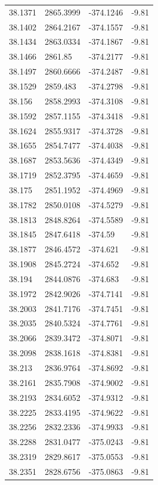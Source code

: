 \begin{table}[H]
\begin{tabular}{llll}
38.1371 & 2865.3999 & -374.1246 & -9.81 \\
38.1402 & 2864.2167 & -374.1557 & -9.81 \\
38.1434 & 2863.0334 & -374.1867 & -9.81 \\
38.1466 & 2861.85 & -374.2177 & -9.81 \\
38.1497 & 2860.6666 & -374.2487 & -9.81 \\
38.1529 & 2859.483 & -374.2798 & -9.81 \\
38.156 & 2858.2993 & -374.3108 & -9.81 \\
38.1592 & 2857.1155 & -374.3418 & -9.81 \\
38.1624 & 2855.9317 & -374.3728 & -9.81 \\
38.1655 & 2854.7477 & -374.4038 & -9.81 \\
38.1687 & 2853.5636 & -374.4349 & -9.81 \\
38.1719 & 2852.3795 & -374.4659 & -9.81 \\
38.175 & 2851.1952 & -374.4969 & -9.81 \\
38.1782 & 2850.0108 & -374.5279 & -9.81 \\
38.1813 & 2848.8264 & -374.5589 & -9.81 \\
38.1845 & 2847.6418 & -374.59 & -9.81 \\
38.1877 & 2846.4572 & -374.621 & -9.81 \\
38.1908 & 2845.2724 & -374.652 & -9.81 \\
38.194 & 2844.0876 & -374.683 & -9.81 \\
38.1972 & 2842.9026 & -374.7141 & -9.81 \\
38.2003 & 2841.7176 & -374.7451 & -9.81 \\
38.2035 & 2840.5324 & -374.7761 & -9.81 \\
38.2066 & 2839.3472 & -374.8071 & -9.81 \\
38.2098 & 2838.1618 & -374.8381 & -9.81 \\
38.213 & 2836.9764 & -374.8692 & -9.81 \\
38.2161 & 2835.7908 & -374.9002 & -9.81 \\
38.2193 & 2834.6052 & -374.9312 & -9.81 \\
38.2225 & 2833.4195 & -374.9622 & -9.81 \\
38.2256 & 2832.2336 & -374.9933 & -9.81 \\
38.2288 & 2831.0477 & -375.0243 & -9.81 \\
38.2319 & 2829.8617 & -375.0553 & -9.81 \\
38.2351 & 2828.6756 & -375.0863 & -9.81 \\

\end{tabular}
\end{table}
